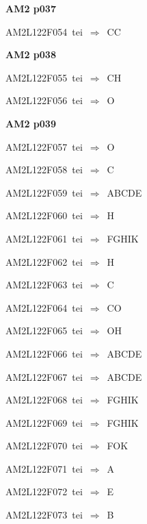 \par\vfill\eject
{\bf\hfill AM2 p037\hfill\hbox{}}\par\bigskip
{\sixrm AM2L122F054\ {\sixit tei}\ }$\Rightarrow$\ CC\par\smallskip

\par\vfill\eject
{\bf\hfill AM2 p038\hfill\hbox{}}\par\bigskip
{\sixrm AM2L122F055\ {\sixit tei}\ }$\Rightarrow$\ CH\par\smallskip
{\sixrm AM2L122F056\ {\sixit tei}\ }$\Rightarrow$\ O\par\smallskip

\par\vfill\eject
{\bf\hfill AM2 p039\hfill\hbox{}}\par\bigskip
{\sixrm AM2L122F057\ {\sixit tei}\ }$\Rightarrow$\ O\par\smallskip
{\sixrm AM2L122F058\ {\sixit tei}\ }$\Rightarrow$\ C\par\smallskip
{\sixrm AM2L122F059\ {\sixit tei}\ }$\Rightarrow$\ ABCDE\par\smallskip
{\sixrm AM2L122F060\ {\sixit tei}\ }$\Rightarrow$\ H\par\smallskip
{\sixrm AM2L122F061\ {\sixit tei}\ }$\Rightarrow$\ FGHIK\par\smallskip
{\sixrm AM2L122F062\ {\sixit tei}\ }$\Rightarrow$\ H\par\smallskip
{\sixrm AM2L122F063\ {\sixit tei}\ }$\Rightarrow$\ C\par\smallskip
{\sixrm AM2L122F064\ {\sixit tei}\ }$\Rightarrow$\ CO\par\smallskip
{\sixrm AM2L122F065\ {\sixit tei}\ }$\Rightarrow$\ OH\par\smallskip
{\sixrm AM2L122F066\ {\sixit tei}\ }$\Rightarrow$\ ABCDE\par\smallskip
{\sixrm AM2L122F067\ {\sixit tei}\ }$\Rightarrow$\ ABCDE\par\smallskip
{\sixrm AM2L122F068\ {\sixit tei}\ }$\Rightarrow$\ FGHIK\par\smallskip
{\sixrm AM2L122F069\ {\sixit tei}\ }$\Rightarrow$\ FGHIK\par\smallskip
{\sixrm AM2L122F070\ {\sixit tei}\ }$\Rightarrow$\ FOK\par\smallskip
{\sixrm AM2L122F071\ {\sixit tei}\ }$\Rightarrow$\ A\par\smallskip
{\sixrm AM2L122F072\ {\sixit tei}\ }$\Rightarrow$\ E\par\smallskip
{\sixrm AM2L122F073\ {\sixit tei}\ }$\Rightarrow$\ B\par\smallskip
